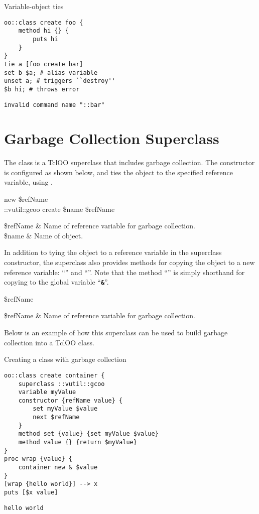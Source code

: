 \documentclass{article}
\begin{document}
\begin{example}{Variable-object ties}
\begin{lstlisting}
oo::class create foo {
    method hi {} {
        puts hi
    }
}
tie a [foo create bar]
set b $a; # alias variable
unset a; # triggers ``destroy''
$b hi; # throws error
\end{lstlisting}
\tcblower
\begin{lstlisting}
invalid command name "::bar"
\end{lstlisting}
\end{example}
\clearpage
\section{Garbage Collection Superclass}
The class  is a TclOO superclass that includes garbage collection.
The constructor is configured as shown below, and ties the object to the specified reference variable, using .
\begin{syntax}
 new \$refName \\
::vutil::gcoo create \$name \$refName
\end{syntax}
\begin{args}
\$refName & Name of reference variable for garbage collection. \\
\$name & Name of object.
\end{args}

In addition to tying the object to a reference variable in the superclass constructor, the  superclass also provides methods for copying the object to a new reference variable: ``\texttt{}'' and ``\textbf{\texttt{}}''.
Note that the method ``\textbf{\texttt{}}'' is simply shorthand for copying to the global variable ``\textbf{\texttt{\&}}''.
\begin{syntax}
 \$refName
\end{syntax}
\begin{syntax}
\end{syntax}
\begin{args}
\$refName & Name of reference variable for garbage collection.
\end{args}

Below is an example of how this superclass can be used to build garbage collection into a TclOO class. 
\begin{example}{Creating a class with garbage collection}
\begin{lstlisting}
oo::class create container {
    superclass ::vutil::gcoo
    variable myValue
    constructor {refName value} {
        set myValue $value
        next $refName
    }
    method set {value} {set myValue $value}
    method value {} {return $myValue}
}
proc wrap {value} {
    container new & $value
}
[wrap {hello world}] --> x
puts [$x value]
\end{lstlisting}
\tcblower
\begin{lstlisting}
hello world
\end{lstlisting}
\end{example}
\end{document}
